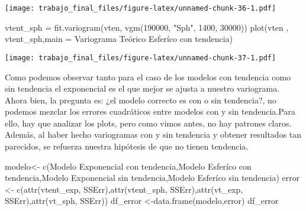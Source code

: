 \documentclass[
  12pt,
]{article}
\newenvironment{Shaded}{\begin{snugshade}}{\end{snugshade}}
\newcommand{\AttributeTok}[1]{\textcolor[rgb]{0.77,0.63,0.00}{#1}}
\newcommand{\DecValTok}[1]{\textcolor[rgb]{0.00,0.00,0.81}{#1}}
\newcommand{\FunctionTok}[1]{\textcolor[rgb]{0.00,0.00,0.00}{#1}}
\newcommand{\NormalTok}[1]{#1}
\newcommand{\OtherTok}[1]{\textcolor[rgb]{0.56,0.35,0.01}{#1}}
\newcommand{\StringTok}[1]{\textcolor[rgb]{0.31,0.60,0.02}{#1}}
\begin{document}
\texttt{[image: trabajo\_final\_files/figure-latex/unnamed-chunk-36-1.pdf]}

\begin{Shaded}
\begin{Highlighting}[]
\NormalTok{vtent\_sph }\OtherTok{=} \FunctionTok{fit.variogram}\NormalTok{(vten, }\FunctionTok{vgm}\NormalTok{(}\DecValTok{190000}\NormalTok{, }\StringTok{"Sph"}\NormalTok{, }\DecValTok{1400}\NormalTok{, }\DecValTok{30000}\NormalTok{))}
\FunctionTok{plot}\NormalTok{(vten , vtent\_sph,}\AttributeTok{main =} \StringTok{\textquotesingle{}Variograma Teórico Esferíco con tendencia\textquotesingle{}}\NormalTok{)}
\end{Highlighting}
\end{Shaded}

\texttt{[image: trabajo\_final\_files/figure-latex/unnamed-chunk-37-1.pdf]}

Como podemos observar tanto para el caso de los modelos con tendencia
como sin tendencia el exponencial es el que mejor se ajusta a nuestro
variograma. Ahora bien, la pregunta es: ¿el modelo correcto es con o sin
tendencia?, no podemos mezclar los errores cuadráticos entre modelos con
y sin tendencia.Para ello, hay que analizar los plots, pero como vimos
antes, no hay patrones claros. Además, al haber hecho variogramas con y
sin tendencia y obtener resultados tan parecidos, se refuerza nuestra
hipótesis de que no tienen tendencia.

\begin{Shaded}
\begin{Highlighting}[]
\NormalTok{modelo}\OtherTok{\textless{}{-}} \FunctionTok{c}\NormalTok{(}\StringTok{\textquotesingle{}Modelo Exponencial con tendencia\textquotesingle{}}\NormalTok{,}\StringTok{\textquotesingle{}Modelo Esferíco con tendencia\textquotesingle{}}\NormalTok{,}\StringTok{\textquotesingle{}Modelo Exponencial sin tendencia\textquotesingle{}}\NormalTok{,}\StringTok{\textquotesingle{}Modelo Esferíco sin tendencia\textquotesingle{}}\NormalTok{)}
\NormalTok{error }\OtherTok{\textless{}{-}} \FunctionTok{c}\NormalTok{(}\FunctionTok{attr}\NormalTok{(vtent\_exp, }\StringTok{\textquotesingle{}SSErr\textquotesingle{}}\NormalTok{),}\FunctionTok{attr}\NormalTok{(vtent\_sph, }\StringTok{\textquotesingle{}SSErr\textquotesingle{}}\NormalTok{),}\FunctionTok{attr}\NormalTok{(vt\_exp, }\StringTok{\textquotesingle{}SSErr\textquotesingle{}}\NormalTok{),}\FunctionTok{attr}\NormalTok{(vt\_sph, }\StringTok{\textquotesingle{}SSErr\textquotesingle{}}\NormalTok{))}
\NormalTok{df\_error }\OtherTok{\textless{}{-}}\FunctionTok{data.frame}\NormalTok{(modelo,error)}
\NormalTok{df\_error}
\end{Highlighting}
\end{Shaded}
\end{document}

